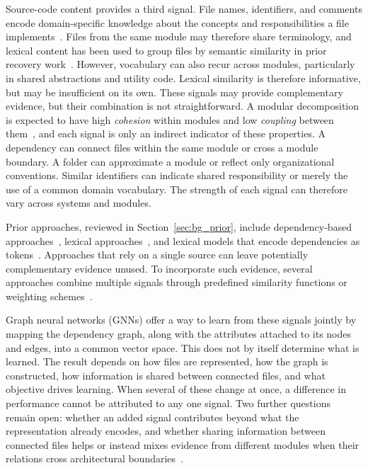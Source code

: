 Source-code content provides a third signal. File names, identifiers, and comments encode domain-specific knowledge about the concepts and responsibilities a file implements~\cite{sarif}. Files from the same module may therefore share terminology, and lexical content has been used to group files by semantic similarity in prior recovery work~\cite{arc,zbr}. However, vocabulary can also recur across modules, particularly in shared abstractions and utility code. Lexical similarity is therefore informative, but may be insufficient on its own.
These signals may provide complementary evidence, but their combination is not straightforward. A modular decomposition is expected to have high \emph{cohesion} within modules and low \emph{coupling} between them~\cite{bunch_sahc_nahc}, and each signal is only an indirect indicator of these properties. A dependency can connect files within the same module or cross a module boundary. A folder can approximate a module or reflect only organizational conventions. Similar identifiers can indicate shared responsibility or merely the use of a common domain vocabulary. The strength of each signal can therefore vary across systems and modules.

Prior approaches, reviewed in Section~\ref{sec:bg_prior}, include dependency-based approaches~\cite{bunch_sahc_nahc,acdc,wca,negar}, lexical approaches~\cite{zbr,arc}, and lexical models that encode dependencies as tokens~\cite{olsson2022automatically}. Approaches that rely on a single source can leave potentially complementary evidence unused. To incorporate such evidence, several approaches combine multiple signals through predefined similarity functions or weighting schemes~\cite{sarif,sade,sc_misra}.

Graph neural networks (GNNs) offer a way to learn from these signals jointly by mapping the dependency graph, along with the attributes attached to its nodes and edges, into a common vector space. This does not by itself determine what is learned. The result depends on how files are represented, how the graph is constructed, how information is shared between connected files, and what objective drives learning. When several of these change at once, a difference in performance cannot be attributed to any one signal. Two further questions remain open: whether an added signal contributes beyond what the representation already encodes, and whether sharing information between connected files helps or instead mixes evidence from different modules when their relations cross architectural boundaries~\cite{gnn_homophily}.

